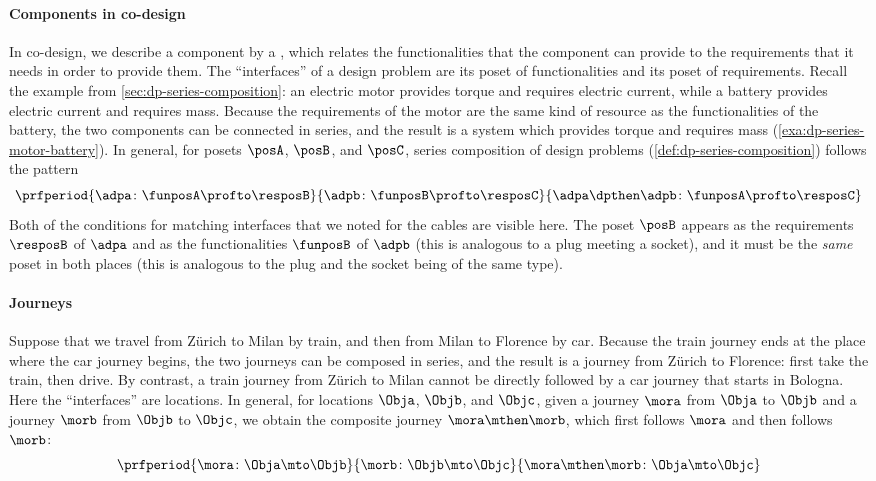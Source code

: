 \paragraph{Components in co-design}
In co-design, we describe a component by a , which relates the functionalities that the component can provide to the requirements that it needs in order to provide them. The ``interfaces'' of a design problem are its poset of functionalities and its poset of requirements. Recall the example from \cref{sec:dp-series-composition}: an electric motor provides torque and requires electric current, while a battery provides electric current and requires mass. Because the requirements of the motor are the same kind of resource as the functionalities of the battery, the two components can be connected in series, and the result is a system which provides torque and requires mass (\cref{exa:dp-series-motor-battery}). In general, for posets $\posA$, $\posB$, and $\posC$, series composition of design problems (\cref{def:dp-series-composition}) follows the pattern
\begin{equation}
    \label{eq:interfaces-dp}
    \prfperiod{
        \adpa \colon \funposA \profto \resposB
    }{
        \adpb \colon \funposB \profto \resposC
    }{
        \adpa \dpthen \adpb \colon \funposA \profto \resposC
    }
\end{equation}
Both of the conditions for matching interfaces that we noted for the cables are visible here. The poset $\posB$ appears as the requirements $\resposB$ of $\adpa$ and as the functionalities $\funposB$ of $\adpb$ (this is analogous to a plug meeting a socket), and it must be the \emph{same} poset in both places (this is analogous to the plug and the socket being of the same type).

\paragraph{Journeys}
Suppose that we travel from Zürich to Milan by train, and then from Milan to Florence by car. Because the train journey ends at the place where the car journey begins, the two journeys can be composed in series, and the result is a journey from Zürich to Florence: first take the train, then drive. By contrast, a train journey from Zürich to Milan cannot be directly followed by a car journey that starts in Bologna. Here the ``interfaces'' are locations. In general, for locations $\Obja$, $\Objb$, and $\Objc$, given a journey $\mora$ from $\Obja$ to $\Objb$ and a journey $\morb$ from $\Objb$ to $\Objc$, we obtain the composite journey $\mora \mthen \morb$, which first follows $\mora$ and then follows $\morb$:
\begin{equation}
    \label{eq:interfaces-journeys}
    \prfperiod{
        \mora \colon \Obja \mto \Objb
    }{
        \morb \colon \Objb \mto \Objc
    }{
        \mora \mthen \morb \colon \Obja \mto \Objc
    }
\end{equation}

